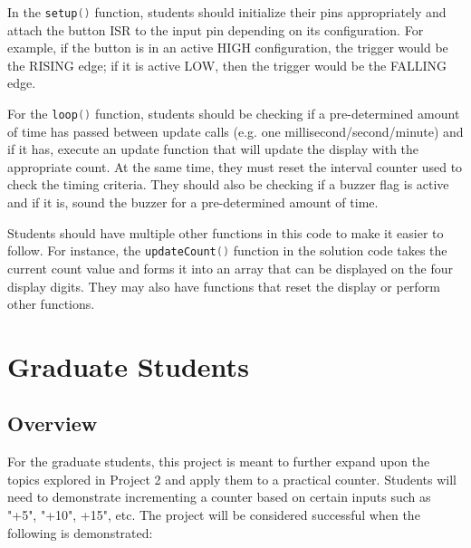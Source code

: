 \documentclass{article}
\begin{document}
        In the \lstinline[language=C++, style=mystyle]{setup()} function, students should initialize their pins appropriately and attach the button ISR to the input pin depending on its configuration.
        For example, if the button is in an active HIGH configuration, the trigger would be the RISING edge; if it is active LOW, then the trigger would be the FALLING edge.

        For the \lstinline[language=C++, style=mystyle]{loop()} function, students should be checking if a pre-determined amount of time has passed between update calls (e.g. one millisecond/second/minute) and if it has, execute an update function that will update the display with the appropriate count.
        At the same time, they must reset the interval counter used to check the timing criteria.
        They should also be checking if a buzzer flag is active and if it is, sound the buzzer for a pre-determined amount of time.

        Students should have multiple other functions in this code to make it easier to follow. 
        For instance, the \lstinline[language=C++, style=mystyle]{updateCount()} function in the solution code takes the current count value and forms it into an array that can be displayed on the four display digits. They may also have functions that reset the display or perform other functions.

        \pagebreak
        

\pagebreak
\section*{Graduate Students}
    \subsection*{Overview}
    For the graduate students, this project is meant to further expand upon the topics explored in Project 2 and apply them to a practical counter.
    Students will need to demonstrate incrementing a counter based on certain inputs such as "+5", "+10", +15", etc.
    The project will be considered successful when the following is demonstrated:
    
\end{document}
